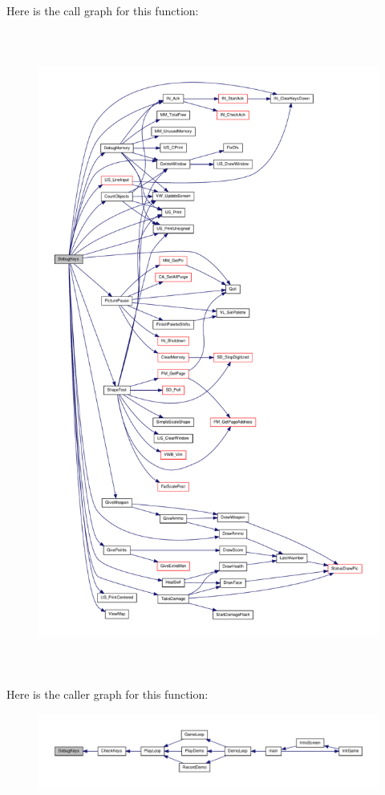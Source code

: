 Here is the call graph for this function:
\nopagebreak
\begin{figure}[H]
\begin{center}
\leavevmode
\includegraphics[height=600pt]{WL__DEBUG_8C_ae61234b6d03ca70ebed1f5a423d17ba5_cgraph}
\end{center}
\end{figure}




Here is the caller graph for this function:
\nopagebreak
\begin{figure}[H]
\begin{center}
\leavevmode
\includegraphics[width=400pt]{WL__DEBUG_8C_ae61234b6d03ca70ebed1f5a423d17ba5_icgraph}
\end{center}
\end{figure}


